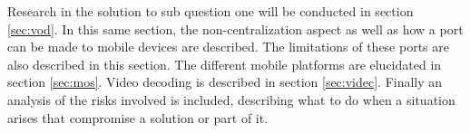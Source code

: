 Research in the solution to sub question one will be conducted in section \ref{sec:vod}. In this same section, the non-centralization aspect as well as how a port can be made to mobile devices are described. The limitations of these ports are also described in this section. The different mobile platforms are elucidated in section \ref{sec:mos}. Video decoding is described in section \ref{sec:videc}. Finally an analysis of the risks involved is included, describing what to do when a situation arises that compromise a solution or part of it.